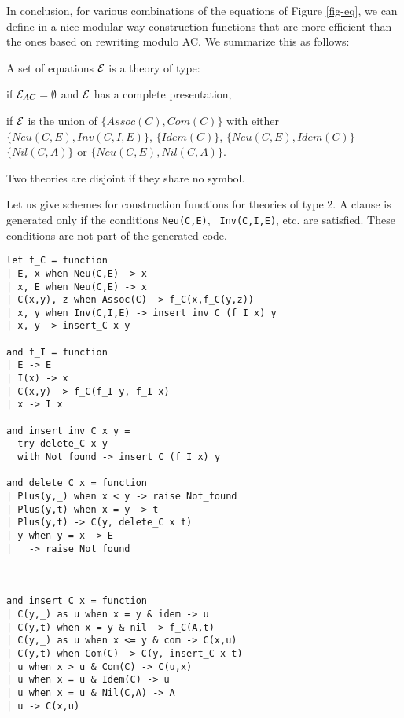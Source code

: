 In conclusion, for various combinations of the equations of Figure
\ref{fig-eq}, we can define in a nice modular way construction
functions that are more efficient than the ones based on rewriting
modulo AC. We summarize this as follows:

\begin{dfn}
A set of equations $\mathcal{E}$ is a theory of type:
\begin{enumi}{}
\item if $\mathcal{E}_{AC}=\emptyset$ and $\mathcal{E}$ has a complete presentation,
\item if $\mathcal{E}$ is the union of $\{Assoc(C),Com(C)\}$
with either $\{Neu(C,E),Inv(C,I,E)\}$,
$\{Idem(C)\}$, $\{Neu(C,E),Idem(C)\}$
$\{Nil(C,A)\}$ or $\{Neu(C,E),Nil(C,A)\}$.
\end{enumi}

\noindent
Two theories are disjoint if they share no symbol.
\end{dfn}


Let us give schemes for construction functions for theories of type 2.
A clause is generated only if the conditions {\tt Neu(C,E)}, {\tt
Inv(C,I,E)}, etc. are satisfied. These conditions are not part of the
generated code.

{\small\begin{verbatim}
let f_C = function
| E, x when Neu(C,E) -> x
| x, E when Neu(C,E) -> x
| C(x,y), z when Assoc(C) -> f_C(x,f_C(y,z))
| x, y when Inv(C,I,E) -> insert_inv_C (f_I x) y
| x, y -> insert_C x y

and f_I = function
| E -> E
| I(x) -> x
| C(x,y) -> f_C(f_I y, f_I x)
| x -> I x

and insert_inv_C x y =
  try delete_C x y
  with Not_found -> insert_C (f_I x) y

and delete_C x = function
| Plus(y,_) when x < y -> raise Not_found
| Plus(y,t) when x = y -> t
| Plus(y,t) -> C(y, delete_C x t)
| y when y = x -> E
| _ -> raise Not_found



and insert_C x = function
| C(y,_) as u when x = y & idem -> u
| C(y,t) when x = y & nil -> f_C(A,t)
| C(y,_) as u when x <= y & com -> C(x,u)
| C(y,t) when Com(C) -> C(y, insert_C x t)
| u when x > u & Com(C) -> C(u,x)
| u when x = u & Idem(C) -> u
| u when x = u & Nil(C,A) -> A
| u -> C(x,u)
\end{verbatim}}


